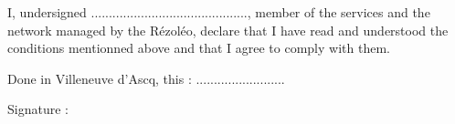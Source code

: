 \documentclass[12pt]{article}
\begin{document}
\vspace*{0.5cm}

I, undersigned ............................................, member of the services and the network managed by the
Rézoléo, declare that I have read and understood the conditions mentionned above and that I agree to comply
with them.

\vspace*{0.5cm}

\hspace{7.5cm} Done in Villeneuve d’Ascq, this : ......................... 


\hspace{7.5cm} Signature :
\end{document}
